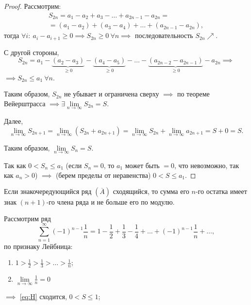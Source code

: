 \begin{proof}
    Рассмотрим:
    \begin{multline*}
        S_{2n} = a_1 - a_2 + a_3 - \ldots + a_{2n - 1} - a_{2n} = \\
        = (a_1 - a_2) + (a_3 - a_4) + \ldots + (a_{2n-1} - a_{2n}),
    \end{multline*}
    тогда $\forall i: \ a_i - a_{i+1} \geqslant 0 \implies S_{2n}\geqslant 0 \ \forall n \implies$ последовательность $S_{2n} \nearrow$.

    С другой стороны,
    \[
        S_{2n} = a_1 - \underbrace{(a_2 - a_3)}_{\geqslant 0} - \underbrace{(a_4 - a_5)}_{\geqslant 0} - \ldots - \underbrace{(a_{2n-2} - a_{2n-1})}_{\geqslant0} - a_{2n} \implies
    \]
    $\implies S_{2n} \leqslant a_1 \ \forall n$.

    Таким образом, $S_{2n}$ не убывает и ограничена сверху $\implies$ по теореме Вейерштрасса $\implies \exists \underset{n\rightarrow\infty}{\lim} S_{2n} = S$.

    Далее,
    \[
        \underset{n\rightarrow\infty}{\lim}S_{2n+1} = \underset{n\rightarrow\infty}{\lim}(S_{2n} + a_{2n+1}) = \underset{n\rightarrow\infty}{\lim}S_{2n} + \underset{n\rightarrow\infty}{\lim} a_{2n+1} = S + 0 = S.
    \]

    Таким образом, $\underset{n\rightarrow\infty}{\lim}S_n = S$.

    Так как $0 < S_n \leqslant a_1$ (если $S_n = 0$, то $a_1$ может быть $=0$, что невозможно, так как $a_n > 0$) $\implies$ (берем пределы от неравенства) $0 < S \leqslant a_1$.
\end{proof}

\begin{corollary}
    Если знакочередующийся ряд $(\overline{A})$ сходящийся, то сумма его $n$-го остатка имеет знак $(n+1)$-го члена ряда и не больше его по модулю.
\end{corollary}

\begin{example}
    Рассмотрим ряд
    \begin{equation}\label{eq:H}
        \sum_{n=1}^{\infty}(-1)^{n-1}\frac{1}{n} = 1 - \frac{1}{2} + \frac{1}{3} - \frac{1}{4} + \ldots + (-1)^{n-1}\frac{1}{n} + \ldots,
    \end{equation}
    по признаку Лейбница:
    \begin{enumerate}
        \item $1 > \frac{1}{2} > \frac{1}{3} > \ldots > \frac{1}{n}$;
        \item $\underset{n\rightarrow\infty}{\lim}\frac{1}{n} = 0$
    \end{enumerate}
    $\implies $ \ref{eq:H} сходится, $0 < S \leqslant 1$;
\end{example}

